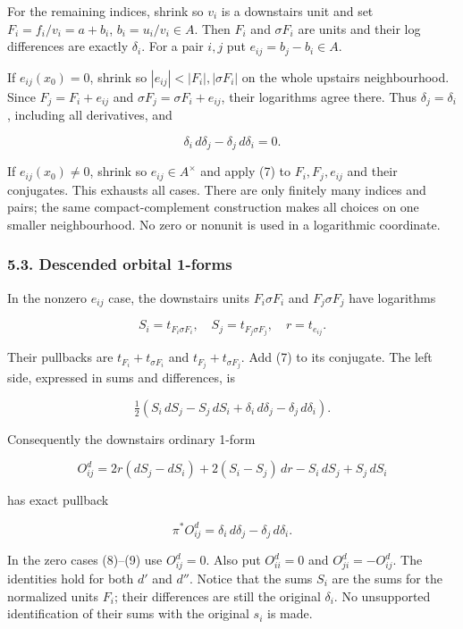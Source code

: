 \documentclass[
  11pt,
]{article}
\begin{document}
For the remaining indices, shrink so \(v_i\) is a downstairs unit and
set \(F_i=f_i/v_i=a+b_i\), \(b_i=u_i/v_i\in A\). Then \(F_i\) and
\(\sigma F_i\) are units and their log differences are exactly
\(\delta_i\). For a pair \(i,j\) put \(e_{ij}=b_j-b_i\in A\).

If \(e_{ij}(x_0)=0\), shrink so \(|e_{ij}|<|F_i|,|\sigma F_i|\) on the
whole upstairs neighbourhood. Since \(F_j=F_i+e_{ij}\) and
\(\sigma F_j=\sigma F_i+e_{ij}\), their logarithms agree there. Thus
\(\delta_j=\delta_i\), including all derivatives, and

\[\delta_i\,d\delta_j-\delta_j\,d\delta_i=0. \tag{9}\]

If \(e_{ij}(x_0)\ne0\), shrink so \(e_{ij}\in A^\times\) and apply (7)
to \(F_i,F_j,e_{ij}\) and their conjugates. This exhausts all cases.
There are only finitely many indices and pairs; the same
compact-complement construction makes all choices on one smaller
neighbourhood. No zero or nonunit is used in a logarithmic coordinate.

\subsubsection{5.3. Descended orbital
1-forms}\label{descended-orbital-1-forms}

In the nonzero \(e_{ij}\) case, the downstairs units \(F_i\sigma F_i\)
and \(F_j\sigma F_j\) have logarithms

\[S_i=t_{F_i\sigma F_i},\quad S_j=t_{F_j\sigma F_j},\quad r=t_{e_{ij}}.\]

Their pullbacks are \(t_{F_i}+t_{\sigma F_i}\) and
\(t_{F_j}+t_{\sigma F_j}\). Add (7) to its conjugate. The left side,
expressed in sums and differences, is

\[\tfrac12(S_i\,dS_j-S_j\,dS_i+\delta_i\,d\delta_j-\delta_j\,d\delta_i).\]

Consequently the downstairs ordinary 1-form

\[O_{ij}^{d}=2r(dS_j-dS_i)+2(S_i-S_j)\,dr-S_i\,dS_j+S_j\,dS_i \tag{10}\]

has exact pullback

\[\pi^*O_{ij}^{d}=\delta_i\,d\delta_j-\delta_j\,d\delta_i.\]

In the zero cases (8)--(9) use \(O_{ij}^{d}=0\). Also put
\(O_{ii}^{d}=0\) and \(O_{ji}^{d}=-O_{ij}^{d}\). The identities hold for
both \(d'\) and \(d''\). Notice that the sums \(S_i\) are the sums for
the normalized units \(F_i\); their differences are still the original
\(\delta_i\). No unsupported identification of their sums with the
original \(s_i\) is made.
\end{document}

